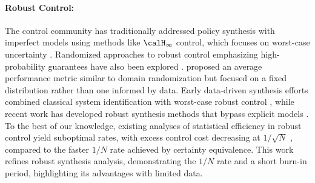\paragraph{Robust Control:} The control community has traditionally addressed policy synthesis with imperfect models using methods like $\calH_\infty$ control, which focuses on worst-case uncertainty \citep{zhou1996robust, bacsar2008h, doyle1982analysis, fan1991robustness}. Randomized approaches to robust control emphasizing high-probability guarantees have also been explored \citep{calafiore2006scenario, stengel1991technical, ray1993monte}. \citet{vidyasagar2001randomized} proposed an average performance metric similar to domain randomization but focused on a fixed distribution rather than one informed by data. Early data-driven synthesis efforts combined classical system identification \citep{ljung1998system} with worst-case robust control \citep{gevers2005identification}, while recent work has developed robust synthesis methods that bypass explicit models \citep{berberich2020robust}. To the best of our knowledge, existing analyses of statistical efficiency in robust control yield suboptimal rates, with excess control cost decreasing at $1/\sqrt{N}$ \citep{dean2020sample}, compared to the faster $1/N$ rate achieved by certainty equivalence. This work refines robust synthesis analysis, demonstrating the $1/N$ rate and a short burn-in period, highlighting its advantages with limited data.